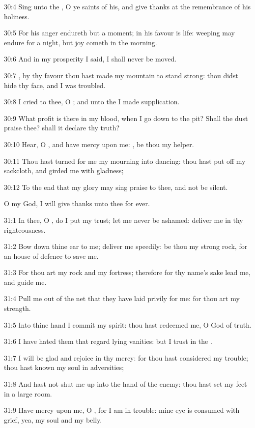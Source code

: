 30:4 Sing unto the \LORD, O ye saints of his, and give thanks at the remembrance of his holiness.

30:5 For his anger endureth but a moment; in his favour is life: weeping may endure for a night, but joy cometh in the morning.

30:6 And in my prosperity I said, I shall never be moved.

30:7 \LORD, by thy favour thou hast made my mountain to stand strong: thou didst hide thy face, and I was troubled.

30:8 I cried to thee, O \LORD; and unto the \LORD I made supplication.

30:9 What profit is there in my blood, when I go down to the pit?  Shall the dust praise thee? shall it declare thy truth?

30:10 Hear, O \LORD, and have mercy upon me: \LORD, be thou my helper.

30:11 Thou hast turned for me my mourning into dancing: thou hast put off my sackcloth, and girded me with gladness;

30:12 To the end that my glory may sing praise to thee, and not be silent.

O \LORD my God, I will give thanks unto thee for ever.



31:1 In thee, O \LORD, do I put my trust; let me never be ashamed: deliver me in thy righteousness.

31:2 Bow down thine ear to me; deliver me speedily: be thou my strong rock, for an house of defence to save me.

31:3 For thou art my rock and my fortress; therefore for thy name's sake lead me, and guide me.

31:4 Pull me out of the net that they have laid privily for me: for thou art my strength.

31:5 Into thine hand I commit my spirit: thou hast redeemed me, O \LORD God of truth.

31:6 I have hated them that regard lying vanities: but I trust in the \LORD.

31:7 I will be glad and rejoice in thy mercy: for thou hast considered my trouble; thou hast known my soul in adversities;

31:8 And hast not shut me up into the hand of the enemy: thou hast set my feet in a large room.

31:9 Have mercy upon me, O \LORD, for I am in trouble: mine eye is consumed with grief, yea, my soul and my belly.

